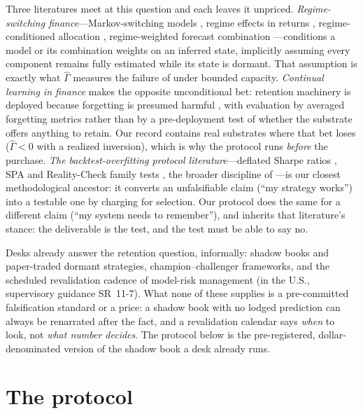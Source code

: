 \documentclass[sigconf,anonymous]{acmart}
\newcommand{\G}{\hat\Gamma}
\begin{document}
Three literatures meet at this question and each leaves it unpriced.
\emph{Regime-switching finance}---Markov-switching models
\cite{hamilton1989new}, regime effects in returns \cite{ang2012regime},
regime-conditioned allocation \cite{guidolin2007asset,
nystrup2018dynamic,nystrup2020greedy}, regime-weighted forecast
combination \cite{elliott2005optimal}---conditions a model or its
combination weights on an inferred state, implicitly assuming every
component remains fully estimated while its state is dormant. That
assumption is exactly what $\G$ measures the failure of under bounded
capacity. \emph{Continual learning in finance} makes the opposite
unconditional bet: retention machinery is deployed because forgetting
is presumed harmful \cite{philps2018continual,pan2026recap,
kirkpatrick2017overcoming,rolnick2019experience,parisi2019continual},
with evaluation by averaged forgetting metrics
\cite{lopez2017gradient} rather than by a pre-deployment test of
whether the substrate offers anything to retain. Our record contains
real substrates where that bet loses ($\G < 0$ with a realized
inversion), which is why the protocol runs \emph{before} the purchase.
\emph{The backtest-overfitting protocol literature}---deflated Sharpe
ratios \cite{bailey2014deflated}, SPA and Reality-Check family tests
\cite{hansen2005spa,white2000reality}, the broader discipline of
\cite{harvey2016backtesting,lopez2018advances}---is our closest
methodological ancestor: it converts an unfalsifiable claim (``my
strategy works'') into a testable one by charging for selection. Our
protocol does the same for a different claim (``my system
needs to remember''), and inherits that literature's stance: the
deliverable is the test, and the test must be able to say no.

Desks already answer the retention question, informally: shadow books
and paper-traded dormant strategies, champion--challenger frameworks,
and the scheduled revalidation cadence of model-risk management (in the
U.S., supervisory guidance SR~11-7). What none of these supplies is a
pre-committed falsification standard or a price: a shadow book with no
lodged prediction can always be renarrated after the fact, and a
revalidation calendar says \emph{when} to look, not \emph{what number
decides}. The protocol below is the pre-registered, dollar-denominated
version of the shadow book a desk already runs.

\section{The protocol}
\label{sec:protocol}
\end{document}
